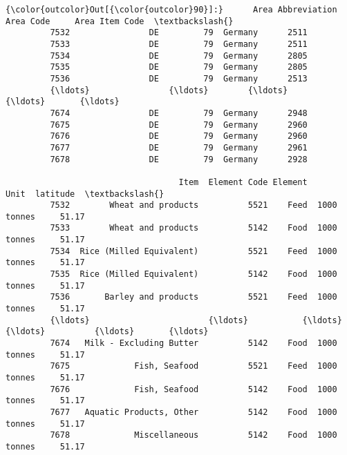 \documentclass[11pt]{article}
\begin{document}
\begin{Verbatim}[commandchars=\\\{\}]
{\color{outcolor}Out[{\color{outcolor}90}]:}      Area Abbreviation  Area Code     Area Item Code  \textbackslash{}
         7532                DE         79  Germany      2511   
         7533                DE         79  Germany      2511   
         7534                DE         79  Germany      2805   
         7535                DE         79  Germany      2805   
         7536                DE         79  Germany      2513   
         {\ldots}                {\ldots}        {\ldots}      {\ldots}       {\ldots}   
         7674                DE         79  Germany      2948   
         7675                DE         79  Germany      2960   
         7676                DE         79  Germany      2960   
         7677                DE         79  Germany      2961   
         7678                DE         79  Germany      2928   
         
                                   Item  Element Code Element         Unit  latitude  \textbackslash{}
         7532        Wheat and products          5521    Feed  1000 tonnes     51.17   
         7533        Wheat and products          5142    Food  1000 tonnes     51.17   
         7534  Rice (Milled Equivalent)          5521    Feed  1000 tonnes     51.17   
         7535  Rice (Milled Equivalent)          5142    Food  1000 tonnes     51.17   
         7536       Barley and products          5521    Feed  1000 tonnes     51.17   
         {\ldots}                        {\ldots}           {\ldots}     {\ldots}          {\ldots}       {\ldots}   
         7674   Milk - Excluding Butter          5142    Food  1000 tonnes     51.17   
         7675             Fish, Seafood          5521    Feed  1000 tonnes     51.17   
         7676             Fish, Seafood          5142    Food  1000 tonnes     51.17   
         7677   Aquatic Products, Other          5142    Food  1000 tonnes     51.17   
         7678             Miscellaneous          5142    Food  1000 tonnes     51.17   
         

\end{Verbatim}
\end{document}
